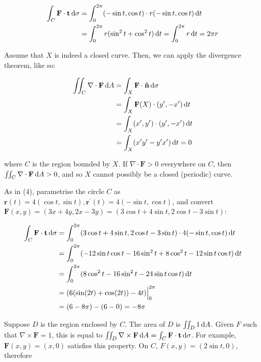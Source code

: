 \begin{align*}
  \int_C \mathbf{F} \cdot \mathbf{t} \mathop{}\!\mathrm{d} \sigma &= \int_0^{2\pi} (-\sin t, \cos t) \cdot r(-\sin t, \cos t) \mathop{}\!\mathrm{d} t \\
  &= \int_0^{2\pi} r(\sin^2 t + \cos^2 t) \mathop{}\!\mathrm{d} t = \int_0^{2\pi} r \mathop{}\!\mathrm{d} t = 2\pi r
\end{align*}


Assume that $X$ is indeed a closed curve. Then, we can apply the divergence theorem, like so:

\begin{align*}
  \iint_C \nabla \cdot \mathbf{F} \mathop{}\!\mathrm{d} A &= \int_X \mathbf{F} \cdot \mathbf{\hat{n}} \mathop{}\!\mathrm{d} \sigma \\
  &= \int_X \mathbf{F}(X) \cdot (y', -x') \mathop{}\!\mathrm{d} t \\
  &= \int_X (x', y') \cdot (y', -x') \mathop{}\!\mathrm{d} t \\
  &= \int_X (x'y' - y'x') \mathop{}\!\mathrm{d} t = 0
\end{align*}

where $C$ is the region bounded by $X$. If $\nabla \cdot \mathbf{F} > 0$ everywhere on $C$, then $\iint_C \nabla \cdot \mathbf{F} \mathop{}\!\mathrm{d} A > 0$, and so $X$ cannot possibly be a closed (periodic) curve.


As in (4), parametrise the circle $C$ as $\mathbf{r}(t) = 4(\cos t, \sin t), \mathbf{r}^{\prime}(t) = 4(-\sin t, \cos t)$, and convert $\mathbf{F}(x, y) = (3x + 4y, 2x - 3y) = (3\cos t + 4\sin t, 2\cos t - 3\sin t)$:

\begin{align*}
  \int_C \mathbf{F} \cdot \mathbf{t} \mathop{}\!\mathrm{d} \sigma &= \int_0^{2\pi} (3\cos t + 4\sin t, 2\cos t - 3\sin t) \cdot 4(-\sin t, \cos t) \mathop{}\!\mathrm{d} t \\
  &= \int_0^{2\pi} (-12\sin t \cos t -16\sin^2 t + 8\cos^2 t - 12\sin t \cos t) \mathop{}\!\mathrm{d} t \\
  &= \int_0^{2\pi} (8\cos^2 t - 16\sin^2t - 24\sin t \cos t) \mathop{}\!\mathrm{d} t \\
  &= (6(\sin(2t) + \cos(2t)) - 4t)\Big|_0^{2\pi} \\
  &= (6 - 8\pi) - (6 - 0) = -8\pi
\end{align*}

Suppose $D$ is the region enclosed by $C$. The area of $D$ is $\iint_D 1 \mathop{}\!\mathrm{d} A$. Given $F$ such that $\nabla \times \mathbf{F} = 1$, this is equal to $\iint_D \nabla \times \mathbf{F} \mathop{}\!\mathrm{d} A = \int_C \mathbf{F} \cdot \mathbf{t} \mathop{}\!\mathrm{d} \sigma$. For example, $\mathbf{F}(x, y) = (x, 0)$ satisfies this property. On $C$, $F(x, y) = (2\sin t, 0)$, therefore

